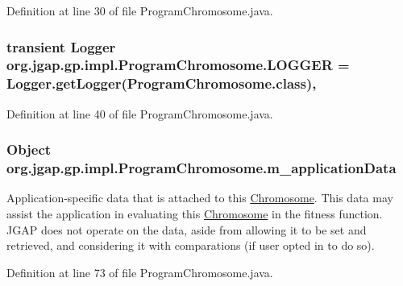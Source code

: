Definition at line 30 of file Program\-Chromosome.\-java.

\hypertarget{classorg_1_1jgap_1_1gp_1_1impl_1_1_program_chromosome_a0c09c5995d7929662288b0fc4d0b4858}{
\subsubsection[{L\-O\-G\-G\-E\-R}]{\setlength{\rightskip}{0pt plus 5cm}transient Logger org.\-jgap.\-gp.\-impl.\-Program\-Chromosome.\-L\-O\-G\-G\-E\-R = Logger.\-get\-Logger(Program\-Chromosome.\-class)\hspace{0.3cm}{\ttfamily [static]}, {\ttfamily [private]}}}\label{classorg_1_1jgap_1_1gp_1_1impl_1_1_program_chromosome_a0c09c5995d7929662288b0fc4d0b4858}


Definition at line 40 of file Program\-Chromosome.\-java.

\hypertarget{classorg_1_1jgap_1_1gp_1_1impl_1_1_program_chromosome_a918187c443c8cfb61eaa33a32801df64}{
\subsubsection[{m\-\_\-application\-Data}]{\setlength{\rightskip}{0pt plus 5cm}Object org.\-jgap.\-gp.\-impl.\-Program\-Chromosome.\-m\-\_\-application\-Data\hspace{0.3cm}{\ttfamily [private]}}}\label{classorg_1_1jgap_1_1gp_1_1impl_1_1_program_chromosome_a918187c443c8cfb61eaa33a32801df64}
Application-\/specific data that is attached to this \hyperlink{classorg_1_1jgap_1_1_chromosome}{Chromosome}. This data may assist the application in evaluating this \hyperlink{classorg_1_1jgap_1_1_chromosome}{Chromosome} in the fitness function. J\-G\-A\-P does not operate on the data, aside from allowing it to be set and retrieved, and considering it with comparations (if user opted in to do so). 

Definition at line 73 of file Program\-Chromosome.\-java.



